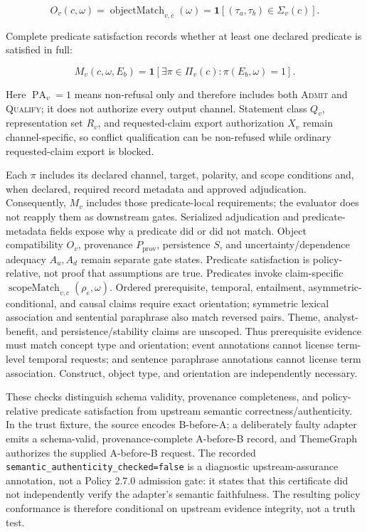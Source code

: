 \documentclass[manuscript,screen,review]{acmart}
\begin{document}
\begin{equation}
O_v(c,\omega)=\operatorname{objectMatch}_{v,c}(\omega)=\mathbf{1}[(\tau_a,\tau_b)\in\Sigma_v(c)].
\label{eq:object-match}
\end{equation}

Complete predicate satisfaction records whether at least one declared predicate is satisfied in full:

\begin{equation}
M_v(c,\omega,E_b)=\mathbf{1}[\exists \pi\in\Pi_v(c):\pi(E_b,\omega)=1].
\label{eq:predicate-identifiability}
\end{equation}

Here $\operatorname{PA}_v=1$ means non-refusal only and therefore includes both \textsc{Admit} and \textsc{Qualify}; it does not authorize every output channel. Statement class $Q_v$, representation set $R_v$, and requested-claim export authorization $X_v$ remain channel-specific, so conflict qualification can be non-refused while ordinary requested-claim export is blocked.

Each $\pi$ includes its declared channel, target, polarity, and scope conditions and, when declared, required record metadata and approved adjudication. Consequently, $M_v$ includes those predicate-local requirements; the evaluator does not reapply them as downstream gates. Serialized adjudication and predicate-metadata fields expose why a predicate did or did not match. Object compatibility $O_v$, provenance $P_{\mathrm{prov}}$, persistence $S$, and uncertainty/dependence adequacy $A_u,A_d$ remain separate gate states. Predicate satisfaction is policy-relative, not proof that assumptions are true. Predicates invoke claim-specific $\operatorname{scopeMatch}_{v,c}(\rho_e,\omega)$. Ordered prerequisite, temporal, entailment, asymmetric-conditional, and causal claims require exact orientation; symmetric lexical association and sentential paraphrase also match reversed pairs. Theme, analyst-benefit, and persistence/stability claims are unscoped. Thus prerequisite evidence must match concept type and orientation; event annotations cannot license term-level temporal requests; and sentence paraphrase annotations cannot license term association. Construct, object type, and orientation are independently necessary.

These checks distinguish schema validity, provenance completeness, and policy-relative predicate satisfaction from upstream semantic correctness/authenticity. In the trust fixture, the source encodes B-before-A; a deliberately faulty adapter emits a schema-valid, provenance-complete A-before-B record, and ThemeGraph authorizes the supplied A-before-B request. The recorded \texttt{semantic\_authenticity\_checked=false} is a diagnostic upstream-assurance annotation, not a Policy 2.7.0 admission gate: it states that this certificate did not independently verify the adapter's semantic faithfulness. The resulting policy conformance is therefore conditional on upstream evidence integrity, not a truth test.
\end{document}
